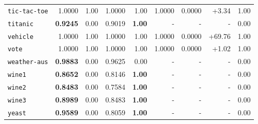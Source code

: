 \begin{tabular}{lrrrrrrrr}
\texttt{tic-tac-toe} & 1.0000 & 1.00 & 1.0000 & 1.00 & 1.0000 & 0.0000 & +3.34 & 1.00\\
\texttt{titanic} & \textbf{0.9245} & 0.00 & 0.9019 & \textbf{1.00} & - & - & - & 0.00\\
\texttt{vehicle} & 1.0000 & 1.00 & 1.0000 & 1.00 & 1.0000 & 0.0000 & +69.76 & 1.00\\
\texttt{vote} & 1.0000 & 1.00 & 1.0000 & 1.00 & 1.0000 & 0.0000 & +1.02 & 1.00\\
\texttt{weather-aus} & \textbf{0.9883} & 0.00 & 0.9625 & 0.00 & - & - & - & 0.00\\
\texttt{wine1} & \textbf{0.8652} & 0.00 & 0.8146 & \textbf{1.00} & - & - & - & 0.00\\
\texttt{wine2} & \textbf{0.8483} & 0.00 & 0.7584 & \textbf{1.00} & - & - & - & 0.00\\
\texttt{wine3} & \textbf{0.8989} & 0.00 & 0.8483 & \textbf{1.00} & - & - & - & 0.00\\
\texttt{yeast} & \textbf{0.9589} & 0.00 & 0.8059 & \textbf{1.00} & - & - & - & 0.00\\
\bottomrule
\end{tabular}
